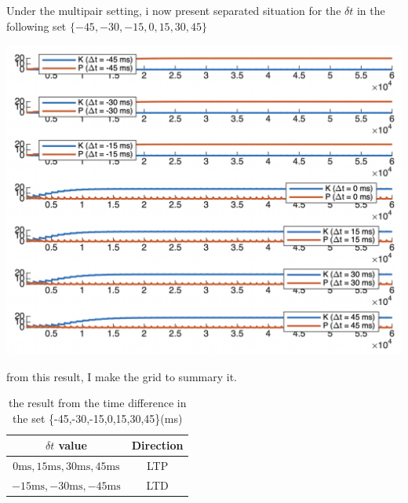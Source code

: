 \documentclass{article}
\begin{document}
Under the multipair setting, i now present separated situation for the $\delta t$ in the following set $\{-45,-30,-15,0,15,30,45\}$
        \begin{center}
        \includegraphics[width=.95\textwidth]{separated_plot.png}
    \end{center}
from this result, I make the grid to summary it.
\begin{table}[h]
    \centering
    \begin{tabular}{|c|c|}
    \hline
    $\delta t$ value & Direction \\
    \hline
    $0\text{ms}, 15\text{ms}, 30\text{ms}, 45\text{ms}$ & LTP \\
    \hline
    $-15\text{ms}, -30\text{ms},-45\text{ms}$ & LTD \\
    \hline
    \end{tabular}
    \caption{the result from the time difference in the set \{-45,-30,-15,0,15,30,45\}(ms)}
    \label{table:delta_t}
\end{table}
\end{document}
